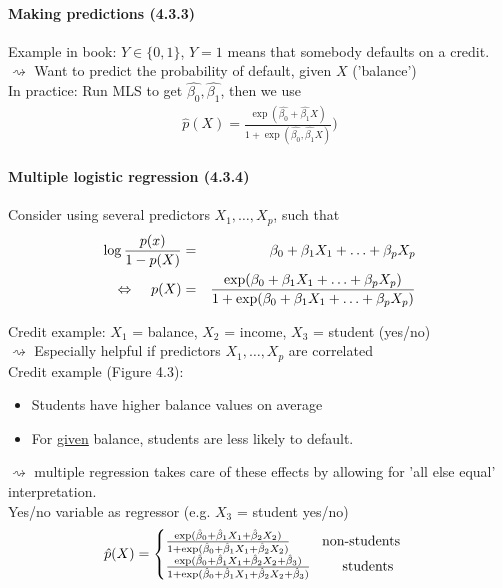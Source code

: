 \documentclass[11pt,a4paper,numbers=endperiod]{scrartcl}
\newcommand{\id}{\hspace*{4mm}}
\begin{document}
{\paragraph{Making predictions (4.3.3)}
$ $\\

Example in book: $Y \in \{0,1\}$, $Y = 1$ means that somebody defaults on a credit.\\
\id \id $\rightsquigarrow$ Want to predict the probability of default, given $X$ ('balance')\\
In practice: Run MLS to get $\hat{\beta_0}, \hat{\beta_1}$, then we use \begin{align*}
	\hat{p}(X) = \frac{\exp(\hat{\beta_0} + \hat{\beta_1} X)}{1 + \exp(\hat{\beta_0}, \hat{\beta_1}X)})
\end{align*}

\paragraph{Multiple logistic regression (4.3.4)}
$ $\\

Consider using several predictors $X_1, \ldots, X_p$, such that \begin{eqnarray*}
	\log \frac{p(x)}{1 - p(X)} &=& \beta_0 + \beta_1 X_1 + \ldots + \beta_p X_p\\
	\Leftrightarrow \id p(X) &=& \frac{\exp(\beta_0 + \beta_1 X_1 + \ldots + \beta_p X_p)}{1 + \exp(\beta_0 + \beta_1 X_1 + \ldots + \beta_p X_p)}\\
\end{eqnarray*}

Credit example: $X_1$ = balance, $X_2$ = income, $X_3$ = student (yes/no)\\
\id $\rightsquigarrow$ Especially helpful if predictors $X_1, \ldots, X_p$ are correlated\\
Credit example (Figure 4.3): \begin{itemize}
	\item Students have higher balance values on average
	\item For \underline{given} balance, students are less likely to default. 
\end{itemize}
$\rightsquigarrow$ multiple regression takes care of these effects by allowing for 'all else equal' interpretation.\\
Yes/no variable as regressor (e.g. $X_3$ = student yes/no) \begin{align*}
	\hat{p}(X) =  \begin{cases}
	\frac{\exp(\hat{\beta}_0 + \hat{\beta}_1X_1 + \hat{\beta}_2X_2)}{ 1+ \exp(\hat{\beta}_0 + \hat{\beta}_1X_1 + \hat{\beta}_2X_2)} \id \id \text{non-students}\\
	\frac{\exp(\hat{\beta}_0 + \hat{\beta}_1X_1 + \hat{\beta}_2X_2 + \hat{\beta}_3)}{ 1+ \exp(\hat{\beta}_0 + \hat{\beta}_1X_1 + \hat{\beta}_2X_2 + \hat{\beta}_3)}  \id \id \text{students}
	\end{cases}
\end{align*}

}
\end{document}
